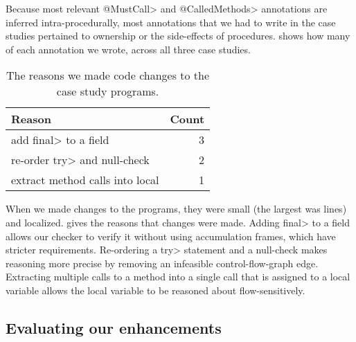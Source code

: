 Because most relevant \<@MustCall> and \<@CalledMethods> annotations
are inferred intra-procedurally, most annotations that we had to write in
the case studies pertained to ownership or the side-effects of procedures.
 shows how many of each annotation we wrote, across all three
case studies.

\begin{table}
  \caption{The reasons we made code changes to the
    case study programs.}
  \label{tab:changes}
  \begin{tabularx}{\columnwidth}{@{}Xr@{}}
    Reason                            &      Count     \\
    \hline
    add \<final> to a field           &     3   \\
    re-order \<try> and null-check    &     2   \\
    extract method calls into local   &     1   \\
  \end{tabularx}
\end{table}

When we made changes to the programs, they were small (the largest was  lines)
and localized.  gives the reasons that changes were made.
%
Adding \<final> to a field allows our checker to verify it without using
accumulation frames, which have stricter requirements.
%
Re-ordering a \<try>
statement and a null-check makes reasoning more precise by removing an
infeasible control-flow-graph edge.
%
Extracting multiple calls to a method
into a single call that is assigned to a local variable allows the local
variable to be reasoned about flow-sensitively.

\subsection{Evaluating our enhancements}
\label{sec:ablation}

\newcommand{\abltablerow}[4]{\textbf{\smaller{#1}} & #2 & #3 & #4}

